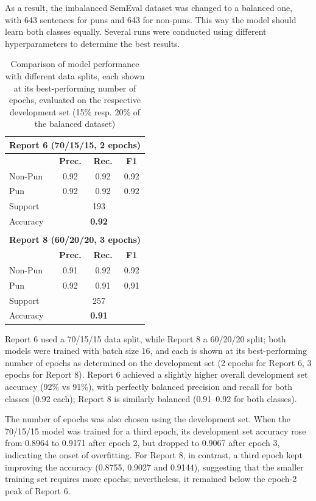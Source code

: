 \documentclass[11pt,a4paper]{article}
\begin{document}
As a result, the imbalanced SemEval dataset was changed to a balanced one, with 643 sentences for puns and 643 for non-puns. This way the model should learn both classes equally.
Several runs were conducted using different hyperparameters to determine the best results.

\begin{table}[h]
\centering
\small %
\setlength{\tabcolsep}{5pt}
\begin{tabular}{l|ccc}
\hline
\multicolumn{4}{c}{\textbf{Report 6 (70/15/15, 2 epochs)}} \\
\hline
& \textbf{Prec.} & \textbf{Rec.} & \textbf{F1} \\
\hline
Non-Pun  & 0.92 & 0.92 & 0.92 \\
Pun      & 0.92 & 0.92 & 0.92 \\
\hline
Support  & \multicolumn{3}{c}{193} \\
Accuracy & \multicolumn{3}{c}{\textbf{0.92}} \\
\hline
\multicolumn{4}{c}{} \\ %
\hline
\multicolumn{4}{c}{\textbf{Report 8 (60/20/20, 3 epochs)}} \\
\hline
& \textbf{Prec.} & \textbf{Rec.} & \textbf{F1} \\
\hline
Non-Pun  & 0.91 & 0.92 & 0.92 \\
Pun      & 0.92 & 0.91 & 0.91 \\
\hline
Support  & \multicolumn{3}{c}{257} \\
Accuracy & \multicolumn{3}{c}{\textbf{0.91}} \\
\hline
\end{tabular}
\caption{Comparison of model performance with different data splits, each shown at its best-performing number of epochs, evaluated on the respective development set (15\% resp. 20\% of the balanced dataset)}
\label{tab:model_comparison}
\end{table}

Report 6 used a 70/15/15 data split, while Report 8 a 60/20/20 split; both models were trained with batch size 16, and each is shown at its best-performing number of epochs as determined on the development set (2 epochs for Report 6, 3 epochs for Report 8). Report 6 achieved a slightly higher overall development set accuracy (92\% vs 91\%), with perfectly balanced precision and recall for both classes (0.92 each); Report 8 is similarly balanced (0.91--0.92 for both classes).


The number of epochs was also chosen using the development set. When the 70/15/15 model was trained for a third epoch, its development set accuracy rose from 0.8964 to 0.9171 after epoch 2, but dropped to 0.9067 after epoch 3, indicating the onset of overfitting. For Report 8, in contrast, a third epoch kept improving the accuracy (0.8755, 0.9027 and 0.9144), suggesting that the smaller training set requires more epochs; nevertheless, it remained below the epoch-2 peak of Report 6.
\end{document}
